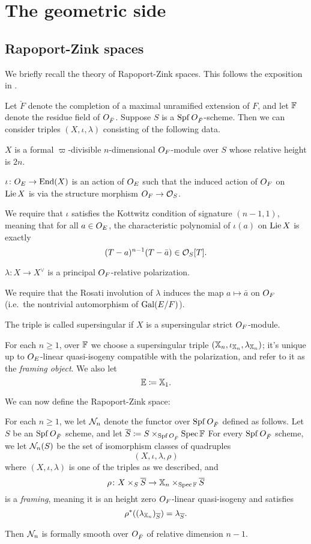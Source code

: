 \chapter{The geometric side}
\label{ch:geo}

\section{Rapoport-Zink spaces}
We briefly recall the theory of Rapoport-Zink spaces.
This follows the exposition in \cite[\S4.1]{ref:survey}.

Let $\breve F$ denote the completion of a maximal unramified extension of $F$,
and let $\mathbb F$ denote the residue field of $O_{\breve F}$.
Suppose $S$ is a $\operatorname{Spf} O_{\breve F}$-scheme.
Then we can consider triples $(X, \iota, \lambda)$ consisting of the following data.
\begin{itemize}
  \ii $X$ is a formal $\varpi$-divisible $n$-dimensional $O_F$-module over $S$
  whose relative height is $2n$.

  \ii $\iota \colon O_E \to \operatorname{End}(X)$ is an action of $O_E$
  such that the induced action of $O_F$ on $\operatorname{Lie} X$
  is via the structure morphism $O_F \to \mathcal{O}_S$.

  We require that $\iota$ satisfies the Kottwitz condition of signature $(n-1,1)$,
  meaning that for all $a \in O_E$,
  the characteristic polynomial of $\iota(a)$ on $\operatorname{Lie} X$
  is exactly \[ (T-a)^{n-1} (T-\bar a) \in \mathcal{O}_S[T]. \]

  \ii $\lambda \colon X \to X^\vee$ is a principal $O_F$-relative polarization.

  We require that the Rosati involution of $\lambda$
  induces the map $a \mapsto \bar a$ on $O_F$
  (i.e.\ the nontrivial automorphism of $\operatorname{Gal}(E/F)$).
\end{itemize}
The triple is called supersingular if $X$ is a supersingular strict $O_F$-module.

For each $n \ge 1$, over $\mathbb F$
we choose a supersingular triple $(\mathbb X_n, \iota_{\mathbb X_n}, \lambda_{\mathbb X_n})$;
it's unique up to $O_E$-linear quasi-isogeny compatible with the polarization,
and refer to it as the \emph{framing object}.
We also let \[ \mathbb E \coloneqq \mathbb X_1. \]

We can now define the Rapoport-Zink space:
\begin{definition}
  For each $n \ge 1$, we let $\mathcal N_n$ denote the
  functor over $\operatorname{Spf} O_{\breve F}$ defined as follows.
  Let $S$ be an $\operatorname{Spf} O_{\breve F}$ scheme, and let
  $\overline S \coloneqq S \times_{\operatorname{Spf} O_{\breve F}} \operatorname{Spec} \mathbb F$
  For every $\operatorname{Spf} O_{\breve F}$ scheme, we let $\mathcal N_n(S)$
  be the set of isomorphism classes of quadruples
  \[ (X, \iota, \lambda, \rho) \]
  where $(X, \iota, \lambda)$ is one of the triples as we described, and
  \[ \rho \colon X \times_S \overline S \to \mathbb X_n \times_{\operatorname{Spec} \mathbb F} \overline S \]
  is a \emph{framing}, meaning it is an height zero $O_F$-linear quasi-isogeny
  and satisfies
  \[ \rho^\ast((\lambda_{\mathbb X_n})_{\overline S}) = \lambda_{\overline S}. \]
\end{definition}
Then $\mathcal N_n$ is formally smooth over $O_{\breve F}$ of relative dimension $n-1$.

